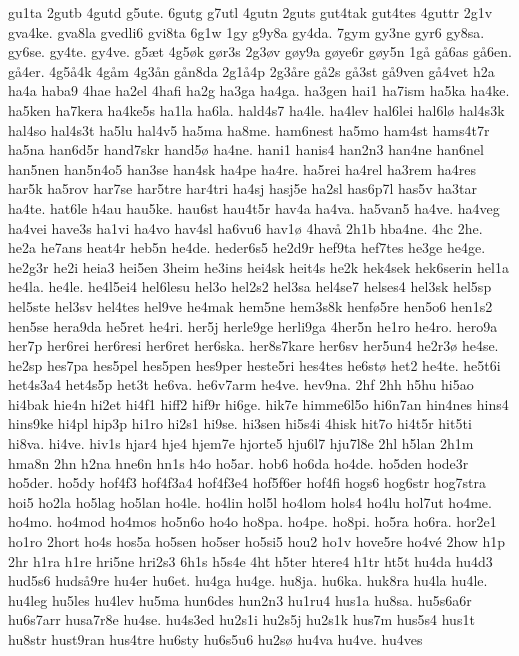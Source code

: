 gu1ta
2gutb
4gutd
g5ute.
6gutg
g7utl
4gutn
2guts
gut4tak
gut4tes
4guttr
2g1v
gva4ke.
gva8la
gvedli6
gvi8ta
6g1w
1gy
g9y8a
gy4da.
7gym
gy3ne
gyr6
gy8sa.
gy6se.
gy4te.
gy4ve.
g5^^e6t
4g5^^f8k
g^^f8r3s
2g3^^f8v
g^^f8y9a
g^^f8ye6r
g^^f8y5n
1g^^e5
g^^e56as
g^^e56en.
g^^e54er.
4g5^^e54k
4g^^e5m
4g3^^e5n
g^^e5n8da
2g1^^e54p
2g3^^e5re
g^^e52s
g^^e53st
g^^e59ven
g^^e54vet
h2a
ha4a
haba9
4hae
ha2el
4hafi
ha2g
ha3ga
ha4ga.
ha3gen
hai1
ha7ism
ha5ka
ha4ke.
ha5ken
ha7kera
ha4ke5s
ha1la
ha6la.
hald4s7
ha4le.
ha4lev
hal6lei
hal6l^^f8
hal4s3k
hal4so
hal4s3t
ha5lu
hal4v5
ha5ma
ha8me.
ham6nest
ha5mo
ham4st
hams4t7r
ha5na
han6d5r
hand7skr
hand5^^f8
ha4ne.
hani1
hanis4
han2n3
han4ne
han6nel
han5nen
han5n4o5
han3se
han4sk
ha4pe
ha4re.
ha5rei
ha4rel
ha3rem
ha4res
har5k
ha5rov
har7se
har5tre
har4tri
ha4sj
hasj5e
ha2sl
has6p7l
has5v
ha3tar
ha4te.
hat6le
h4au
hau5ke.
hau6st
hau4t5r
hav4a
ha4va.
ha5van5
ha4ve.
ha4veg
ha4vei
have3s
ha1vi
ha4vo
hav4sl
ha6vu6
hav1^^f8
4hav^^e5
2h1b
hba4ne.
4hc
2he.
he2a
he7ans
heat4r
heb5n
he4de.
heder6s5
he2d9r
hef9ta
hef7tes
he3ge
he4ge.
he2g3r
he2i
heia3
hei5en
3heim
he3ins
hei4sk
heit4s
he2k
hek4sek
hek6serin
hel1a
he4la.
he4le.
he4l5ei4
hel6lesu
hel3o
hel2s2
hel3sa
hel4se7
helses4
hel3sk
hel5sp
hel5ste
hel3sv
hel4tes
hel9ve
he4mak
hem5ne
hem3s8k
henf^^f85re
hen5o6
hen1s2
hen5se
hera9da
he5ret
he4ri.
her5j
herle9ge
herli9ga
4her5n
he1ro
he4ro.
hero9a
her7p
her6rei
her6resi
her6ret
her6ska.
her8s7kare
her6sv
her5un4
he2r3^^f8
he4se.
he2sp
hes7pa
hes5pel
hes5pen
hes9per
heste5ri
hes4tes
he6st^^f8
het2
he4te.
he5t6i
het4s3a4
het4s5p
het3t
he6va.
he6v7arm
he4ve.
hev9na.
2hf
2hh
h5hu
hi5ao
hi4bak
hie4n
hi2et
hi4f1
hiff2
hif9r
hi6ge.
hik7e
himme6l5o
hi6n7an
hin4nes
hins4
hins9ke
hi4pl
hip3p
hi1ro
hi2s1
hi9se.
hi3sen
hi5s4i
4hisk
hit7o
hi4t5r
hit5ti
hi8va.
hi4ve.
hiv1s
hjar4
hje4
hjem7e
hjorte5
hju6l7
hju7l8e
2hl
h5lan
2h1m
hma8n
2hn
h2na
hne6n
hn1s
h4o
ho5ar.
hob6
ho6da
ho4de.
ho5den
hode3r
ho5der.
ho5dy
hof4f3
hof4f3a4
hof4f3e4
hof5f6er
hof4fi
hogs6
hog6str
hog7stra
hoi5
ho2la
ho5lag
ho5lan
ho4le.
ho4lin
hol5l
ho4lom
hols4
ho4lu
hol7ut
ho4me.
ho4mo.
ho4mod
ho4mos
ho5n6o
ho4o
ho8pa.
ho4pe.
ho8pi.
ho5ra
ho6ra.
hor2e1
ho1ro
2hort
ho4s
hos5a
ho5sen
ho5ser
ho5si5
hou2
ho1v
hove5re
ho4v^^e9
2how
h1p
2hr
h1ra
h1re
hri5ne
hri2s3
6h1s
h5s4e
4ht
h5ter
htere4
h1tr
ht5t
hu4da
hu4d3
hud5s6
huds^^e59re
hu4er
hu6et.
hu4ga
hu4ge.
hu8ja.
hu6ka.
huk8ra
hu4la
hu4le.
hu4leg
hu5les
hu4lev
hu5ma
hun6des
hun2n3
hu1ru4
hus1a
hu8sa.
hu5s6a6r
hu6s7arr
husa7r8e
hu4se.
hu4s3ed
hu2s1i
hu2s5j
hu2s1k
hus7m
hus5s4
hus1t
hu8str
hust9ran
hus4tre
hu6sty
hu6s5u6
hu2s^^f8
hu4va
hu4ve.
hu4ves
